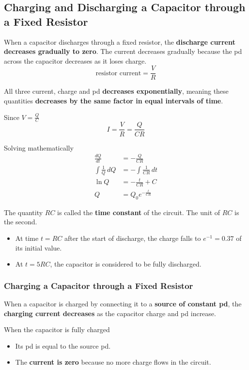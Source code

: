 \subsection{Charging and Discharging a Capacitor through a Fixed Resistor}

When a capacitor discharges through a fixed resistor, the \textbf{discharge current decreases gradually to zero}. The current decreases gradually because the pd across the capacitor decreases as it loses charge.
$$\text{resistor current}=\frac{V}{R}$$

All three current, charge and pd \textbf{decreases exponentially}, meaning these quantities \textbf{decreases by the same factor in equal intervals of time}.

Since $V=\frac{Q}{C}$
$$I=\frac{V}{R}=\frac{Q}{CR}$$

Solving mathematically
\begin{align*}
    \frac{dQ}{dt}&=-\frac{Q}{CR}\\
    \int\frac{1}{Q}\,dQ&=-\int\frac{1}{CR}\,dt\\
    \ln Q&=-\frac{t}{CR}+C\\
    Q&=Q_0e^{-\frac{t}{CR}}
\end{align*}

The quantity $RC$ is called the \textbf{time constant} of the circuit. The unit of $RC$ is the second.
\begin{itemize}
    \item At time $t=RC$ after the start of discharge, the charge falls to $e^{-1}=0.37$ of its initial value.
    \item At $t=5RC$, the capacitor is considered to be fully discharged.
\end{itemize}

\subsubsection*{Charging a Capacitor through a Fixed Resistor}

When a capacitor is charged by connecting it to a \textbf{source of constant pd}, the \textbf{charging current decreases} as the capacitor charge and pd increase.

When the capacitor is fully charged
\begin{itemize}
    \item Its pd is equal to the source pd.
    \item The \textbf{current is zero} because no more charge flows in the circuit.
\end{itemize}

